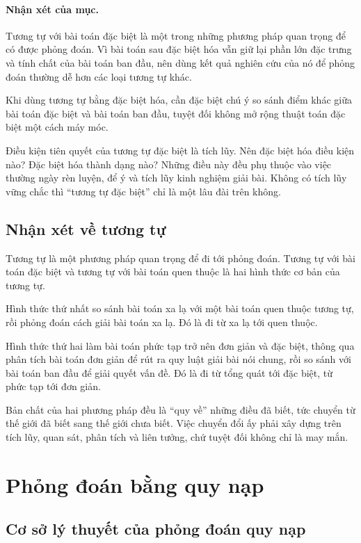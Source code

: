 \documentclass[11pt]{article}
\begin{document}
\paragraph{Nhận xét của mục.}
Tương tự với bài toán đặc biệt là một trong những phương pháp quan trọng để
có được phỏng đoán. Vì bài toán sau đặc biệt hóa vẫn giữ lại phần lớn đặc
trưng và tính chất của bài toán ban đầu, nên dùng kết quả nghiên cứu của nó
để phỏng đoán thường dễ hơn các loại tương tự khác.

Khi dùng tương tự bằng đặc biệt hóa, cần đặc biệt chú ý so sánh điểm khác
giữa bài toán đặc biệt và bài toán ban đầu, tuyệt đối không mở rộng thuật
toán đặc biệt một cách máy móc.

Điều kiện tiên quyết của tương tự đặc biệt là tích lũy. Nên đặc biệt hóa điều
kiện nào? Đặc biệt hóa thành dạng nào? Những điều này đều phụ thuộc vào việc
thường ngày rèn luyện, để ý và tích lũy kinh nghiệm giải bài. Không có tích
lũy vững chắc thì ``tương tự đặc biệt'' chỉ là một lâu đài trên không.

\subsection{Nhận xét về tương tự}

Tương tự là một phương pháp quan trọng để đi tới phỏng đoán. Tương tự với bài
toán đặc biệt và tương tự với bài toán quen thuộc là hai hình thức cơ bản của
tương tự.

Hình thức thứ nhất so sánh bài toán xa lạ với một bài toán quen thuộc tương
tự, rồi phỏng đoán cách giải bài toán xa lạ. Đó là đi từ xa lạ tới quen
thuộc.

Hình thức thứ hai làm bài toán phức tạp trở nên đơn giản và đặc biệt, thông
qua phân tích bài toán đơn giản để rút ra quy luật giải bài nói chung, rồi so
sánh với bài toán ban đầu để giải quyết vấn đề. Đó là đi từ tổng quát tới đặc
biệt, từ phức tạp tới đơn giản.

Bản chất của hai phương pháp đều là ``quy về'' những điều đã biết, tức chuyển
từ thế giới đã biết sang thế giới chưa biết. Việc chuyển đổi ấy phải xây dựng
trên tích lũy, quan sát, phân tích và liên tưởng, chứ tuyệt đối không chỉ là
may mắn.

\section{Phỏng đoán bằng quy nạp}

\subsection{Cơ sở lý thuyết của phỏng đoán quy nạp}
\end{document}
